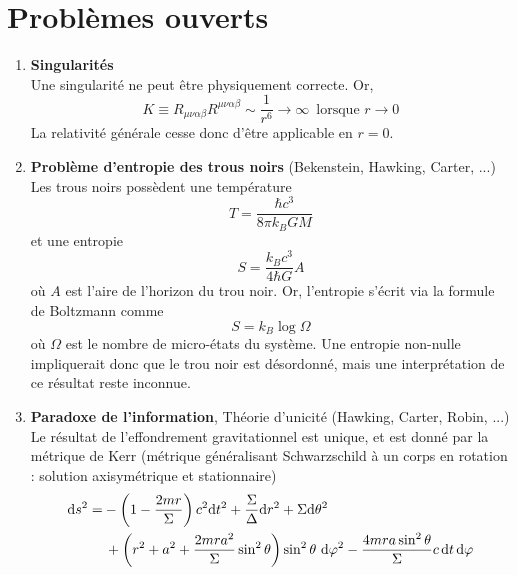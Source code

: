 \section{Problèmes ouverts}
\begin{enumerate}
    \item \textbf{Singularités}\\
    Une singularité ne peut être physiquement correcte. Or,
    \begin{equation}
        K \equiv R_{\mu\nu \alpha\beta} R^{\mu\nu\alpha\beta} \sim \frac{1}{r^6} \to \infty \, \text{ lorsque } r\to 0
    \end{equation}
    La relativité générale cesse donc d'être applicable en $r=0$.\\
    \item \textbf{Problème d'entropie des trous noirs} (Bekenstein, Hawking, Carter, ...)\\
    Les trous noirs possèdent une température
    \begin{equation}
        T = \frac{\hbar c^3}{8\pi k_B GM}
    \end{equation}
    et une entropie
    \begin{equation}
        S = \frac{k_B c^3}{4 \hbar G}A
    \end{equation}
    où $A$ est l'aire de l'horizon du trou noir. Or, l'entropie s'écrit via la formule de Boltzmann comme
    \begin{equation}
        S = k_B \log \Omega
    \end{equation}
    où $\Omega$ est le nombre de micro-états du système. Une entropie non-nulle impliquerait donc que le trou noir est désordonné, mais une interprétation de ce résultat reste inconnue.\\
    \item \textbf{Paradoxe de l'information}, Théorie d'unicité (Hawking, Carter, Robin, ...)\\
    Le résultat de l'effondrement gravitationnel est unique, et est donné par la métrique de Kerr (métrique généralisant Schwarzschild à un corps en rotation : solution axisymétrique et stationnaire) 
    \begin{align*}
    \mathrm{d} s^{2} =& -\left( 1 - \frac{2m r}{\Sigma} \right) c^{2} \mathrm{d} t^{2} + \frac{\Sigma}{\Delta} \mathrm{d} r^{2} + \Sigma \mathrm{d} \theta^{2} \\
    & \,+ \left(r^2+ a^2 + \frac{2m r a^{2}}{\Sigma} \sin^{2}\theta \right) \sin^{2}\theta \ \mathrm{d} \varphi^{2} - \frac{4m ra \sin^{2} \theta}{\Sigma} c \, \mathrm{d} t \, \mathrm{d} \varphi
    \end{align*}

\end{enumerate}
